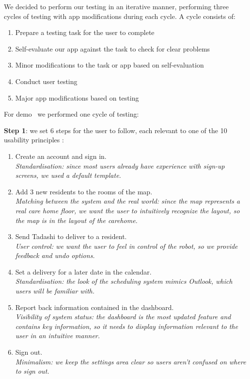 \documentclass{article}
\begin{document}
We decided to perform our testing in an iterative manner, performing three cycles of testing with app modifications during each cycle. A cycle consists of:
\begin{enumerate}
  \item Prepare a testing task for the user to complete
  \item Self-evaluate our app against the task to check for clear problems
  \item Minor modifications to the task or app based on self-evaluation
  \item Conduct user testing
  \item Major app modifications based on testing
\end{enumerate}

For demo \demoNumber\ we performed one cycle of testing:

{\bf Step 1}: we set 6 steps for the user to follow, each relevant to one of the 10 usability principles \cite{heuristics}:
\begin{enumerate}
  \item Create an account and sign in. \\{\it Standardisation: since most users already have experience with sign-up screens, we used a default template.}
  \item Add 3 new residents to the rooms of the map. \\{\it Matching between the system and the real world: since the map represents a real care home floor, we want the user to intuitively recognize the layout, so the map is in the layout of the carehome.}
  \item Send Tadashi to deliver to a resident. \\{\it User control: we want the user to feel in control of the robot, so we provide feedback and undo options.}
  \item Set a delivery for a later date in the calendar. \\{\it Standardisation: the look of the scheduling system mimics Outlook, which users will be familiar with.}
  \item Report back information contained in the dashboard. \\{\it Visibility of system status: the dashboard is the most updated feature and contains key information, so it needs to display information relevant to the user in an intuitive manner.}
  \item Sign out. \\{\it Minimalism: we keep the settings area clear so users aren't confused on where to sign out.}
\end{enumerate}
\end{document}
